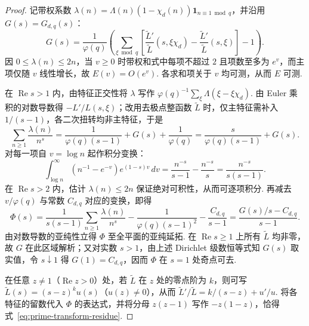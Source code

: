 \begin{proof}
记带权系数 $\lambda(n)=\Lambda(n)(1-\chi_d(n))\mathbf 1_{n\equiv1\bmod q}$，并沿用 $G(s)=G_{d,q}(s)$：
\[
 G(s)=\frac1{\varphi(q)}\left(\sum_{\xi\bmod q}
 \left[\frac{\widetilde L'}{\widetilde L}(s,\xi\chi_d)
             -\frac{\widetilde L'}{\widetilde L}(s,\xi)\right]-1\right).
\]
因 $0\le\lambda(n)\le 2n$，当 $v\ge0$ 时带权和式中每项不超过 $2$ 且项数至多为 $e^v$，而主项仅随 $v$ 线性增长，故 $E(v)=O(e^v)$. 各求和项关于 $v$ 均可测，从而 $E$ 可测.

在 $\operatorname{Re}s>1$ 内，由特征正交性将 $\lambda$ 写作 $\varphi(q)^{-1}\sum_\xi \Lambda(\xi-\xi\chi_d)$. 由 Euler 乘积的对数导数得 $-L'/L(s,\xi)$；改用去极点整函数 $\widetilde L$ 时，仅主特征需补入 $1/(s-1)$，各二次扭转均非主特征，于是
\[
 \sum_{n\ge1}\frac{\lambda(n)}{n^s}
 =\frac1{\varphi(q)(s-1)}+G(s)+\frac1{\varphi(q)}
 =\frac{s}{\varphi(q)(s-1)}+G(s).
\]
对每一项自 $v=\log n$ 起作积分变换：
\[
 \int_{\log n}^\infty (n^{-1}-e^{-v})e^{(1-s)v}\,dv
 =\frac{n^{-s}}{s-1}-\frac{n^{-s}}s=\frac{n^{-s}}{s(s-1)}.
\]
在 $\operatorname{Re}s>2$ 内，估计 $\lambda(n)\le 2n$ 保证绝对可积性，从而可逐项积分. 再减去 $v/\varphi(q)$ 与常数 $C_{d,q}$ 对应的变换，即得
\[
 \Phi(s)=\frac{1}{s(s-1)}\sum_{n\ge1}\frac{\lambda(n)}{n^s}
            -\frac{1}{\varphi(q)(s-1)^2}-\frac{C_{d,q}}{s-1}
         =\frac{G(s)/s-C_{d,q}}{s-1}.
\]
由对数导数的亚纯性立得 $\Phi$ 至全平面的亚纯延拓. 在 $\operatorname{Re}s\ge1$ 上所有 $\widetilde L$ 均非零，故 $G$ 在此区域解析；又对实数 $s>1$，由上述 Dirichlet 级数恒等式知 $G(s)$ 取实值，令 $s\downarrow1$ 得 $G(1)=C_{d,q}$，因而 $\Phi$ 在 $s=1$ 处奇点可去.

在任意 $z\ne1$（$\operatorname{Re}z>0$）处，若 $\widetilde L$ 在 $z$ 处的零点阶为 $k$，则可写 $\widetilde L(s)=(s-z)^k u(s)$（$u(z)\ne0$），从而 $\widetilde L'/\widetilde L=k/(s-z)+u'/u$. 将各特征的留数代入 $\Phi$ 的表达式，并将分母 $z(z-1)$ 写作 $-z(1-z)$，恰得式~\eqref{eq:prime-transform-residue}.
\end{proof}

